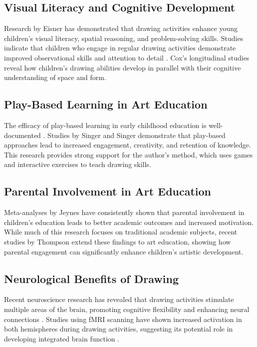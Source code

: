 \documentclass{article}
\begin{document}
\subsection{Visual Literacy and Cognitive Development}

Research by Eisner \cite{4eisner2003arts} has demonstrated that drawing activities enhance young children's visual literacy, spatial reasoning, and problem-solving skills. Studies indicate that children who engage in regular drawing activities demonstrate improved observational skills and attention to detail \cite{5winner2019art}. Cox's longitudinal studies \cite{6cox2005pictorial} reveal how children's drawing abilities develop in parallel with their cognitive understanding of space and form.

\subsection{Play-Based Learning in Art Education}

The efficacy of play-based learning in early childhood education is well-documented \cite{7wainwright2020playful}. Studies by Singer and Singer \cite{8singer2009imagination} demonstrate that play-based approaches lead to increased engagement, creativity, and retention of knowledge. This research provides strong support for the author's method, which uses games and interactive exercises to teach drawing skills.

\subsection{Parental Involvement in Art Education}

Meta-analyses by Jeynes \cite{9jeynes2016meta} have consistently shown that parental involvement in children's education leads to better academic outcomes and increased motivation. While much of this research focuses on traditional academic subjects, recent studies by Thompson \cite{10thompson2007culture} extend these findings to art education, showing how parental engagement can significantly enhance children's artistic development.

\subsection{Neurological Benefits of Drawing}

Recent neuroscience research has revealed that drawing activities stimulate multiple areas of the brain, promoting cognitive flexibility and enhancing neural connections \cite{11chamberlain2014drawing}. Studies using fMRI scanning have shown increased activation in both hemispheres during drawing activities, suggesting its potential role in developing integrated brain function \cite{12bolwerk2014art}.
\end{document}
